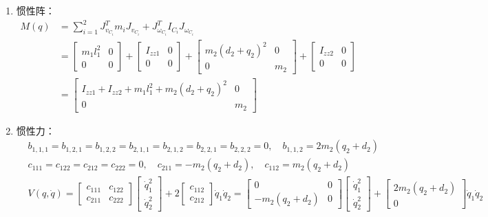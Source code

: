 \documentclass[
12pt, %
a4paper, 
oneside, %
]{scrartcl}
\begin{document}
{\begin{enumerate}
\begin{align*}
\end{align*}
\item 惯性阵：
\begin{align*}
M(q) &= \sum_{i = 1}^{2} J_{v_{C_i}}^T m_i J_{v_{C_i}} + J_{\omega_{C_i}}^T I_{C_i} J_{\omega_{C_i}} \\
&= \begin{bmatrix} m_1 l_1^2 & 0 \\ 0 & 0 \end{bmatrix} + \begin{bmatrix} I_{zz1} & 0 \\ 0 & 0 \end{bmatrix} + \begin{bmatrix} m_2(d_2 + q_2)^2 & 0 \\ 0 & m_2 \end{bmatrix} + \begin{bmatrix} I_{zz2} & 0 \\ 0 & 0 \end{bmatrix} \\
&= \begin{bmatrix} I_{zz1} + I_{zz2} + m_1 l_1^2 + m_2(d_2 + q_2)^2 & 0 \\ 0 & m_2 \end{bmatrix}
\end{align*}
\item 惯性力：
\begin{align*}
&b_{1,1,1} = b_{1,2,1} = b_{1,2,2} = b_{2,1,1} = b_{2,1,2} = b_{2,2,1} = b_{2,2,2} = 0, \quad b_{1,1,2} = 2m_2(q_2 + d_2) \\
&c_{111} = c_{122} = c_{212} = c_{222} = 0, \quad c_{211} = -m_2(q_2 + d_2), \quad c_{112} = m_2(q_2 + d_2) \\
&V(q, \dot{q}) = \begin{bmatrix} c_{111} & c_{122} \\ c_{211} & c_{222} \end{bmatrix} \begin{bmatrix} \dot{q}_1^2 \\ \dot{q}_2^2 \end{bmatrix} + 2\begin{bmatrix} c_{112} \\ c_{212} \end{bmatrix} \dot{q}_1 \dot{q}_2 = \begin{bmatrix} 0 & 0 \\ -m_2(q_2 + d_2) & 0 \end{bmatrix} \begin{bmatrix} \dot{q}_1^2 \\ \dot{q}_2^2 \end{bmatrix} + \begin{bmatrix} 2m_2(q_2 + d_2) \\ 0 \end{bmatrix} \dot{q}_1 \dot{q}_2

\end{align*}
\end{enumerate}}
\end{document}
